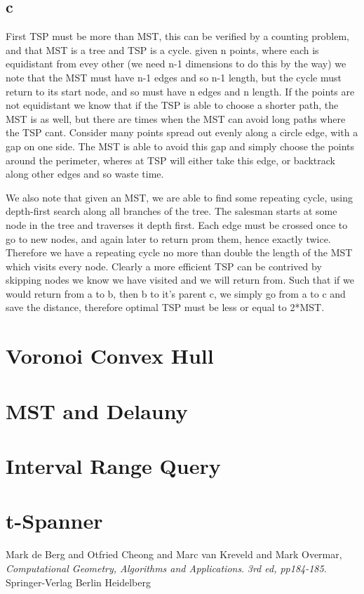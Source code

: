\documentclass{article}
\begin{document}
\subsection*{c}
First TSP must be more than MST, this can be verified by a counting problem, and that MST is a tree and TSP is a cycle.
given n points, where each is equidistant from evey other (we need n-1 dimensions to do this by the way) we note that the MST must have n-1 edges and so n-1 length, but the cycle must return to its start node, and so must have n edges and n length.
If the points are not equidistant we know that if the TSP is able to choose a shorter path, the MST is as well, but there are times when the MST can avoid long paths where the TSP cant.
Consider many points spread out evenly along a circle edge, with a gap on one side.
The MST is able to avoid this gap and simply choose the points around the perimeter, wheres at TSP will either take this edge, or backtrack along other edges and so waste time.

We also note that given an MST, we are able to find some repeating cycle, using depth-first search along all branches of the tree.
The salesman starts at some node in the tree and traverses it depth first.
Each edge must be crossed once to go to new nodes, and again later to return prom them, hence exactly twice.
Therefore we have a repeating cycle no more than double the length of the MST which visits every node.
Clearly a more efficient TSP can be contrived by skipping nodes we know we have visited and we will return from.
Such that if we would return from a to b, then b to it's parent c, we simply go from a to c and save the distance, therefore optimal TSP must be less or equal to 2*MST.

\section {Voronoi Convex Hull}

\section {MST and Delauny}

\section {Interval Range Query}

\section {t-Spanner}

\begin{thebibliography}{9}

	Mark de Berg and Otfried Cheong and Marc van Kreveld and Mark Overmar,
	\emph{Computational Geometry, Algorithms and Applications}.
	\emph{3rd ed, pp184-185}.
	Springer-Verlag Berlin Heidelberg
\end{thebibliography}
\end{document}
